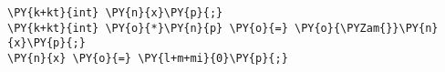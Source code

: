 \begin{Verbatim}[commandchars=\\\{\}]
\PY{k+kt}{int} \PY{n}{x}\PY{p}{;}
\PY{k+kt}{int} \PY{o}{*}\PY{n}{p} \PY{o}{=} \PY{o}{\PYZam{}}\PY{n}{x}\PY{p}{;}
\PY{n}{x} \PY{o}{=} \PY{l+m+mi}{0}\PY{p}{;}
\end{Verbatim}
